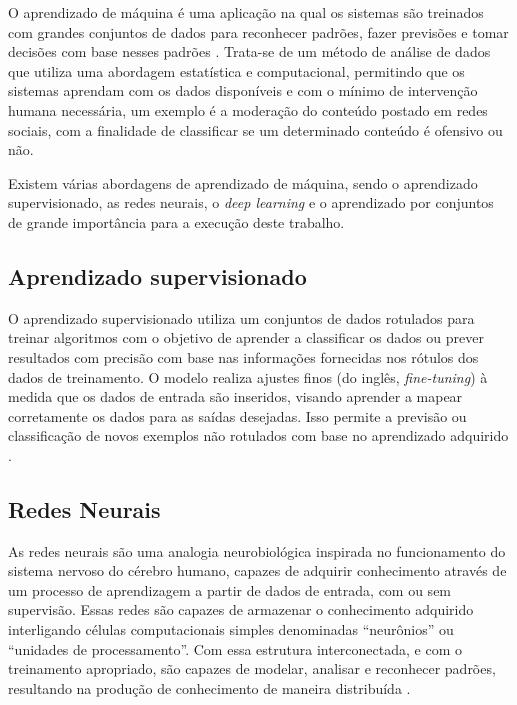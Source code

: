 O aprendizado de máquina é uma aplicação na qual os sistemas são treinados com grandes conjuntos de dados para reconhecer padrões, fazer previsões e tomar decisões com base nesses padrões \cite{HoschMachineLearning}. Trata-se de um método de análise de dados que utiliza uma abordagem estatística e computacional, permitindo que os sistemas aprendam com os dados disponíveis e com o mínimo de intervenção humana necessária, um exemplo é a moderação do conteúdo postado em redes sociais, com a finalidade de classificar se um determinado conteúdo é ofensivo ou não.

Existem várias abordagens de aprendizado de máquina, sendo o aprendizado supervisionado, as redes neurais, o \textit{deep learning} e o aprendizado por conjuntos de grande importância para a execução deste trabalho.

\subsection{Aprendizado supervisionado}

O aprendizado supervisionado utiliza um conjuntos de dados rotulados para treinar algoritmos com o objetivo de aprender a classificar os dados ou prever resultados com precisão com base nas informações fornecidas nos rótulos dos dados de treinamento. O modelo realiza ajustes finos (do inglês, \textit{fine-tuning}) à medida que os dados de entrada são inseridos, visando aprender a mapear corretamente os dados para as saídas desejadas. Isso permite a previsão ou classificação de novos exemplos não rotulados com base no aprendizado adquirido \cite{RussellNorvig1995}.

\subsection{Redes Neurais}

As redes neurais são uma analogia neurobiológica inspirada no funcionamento do sistema nervoso do cérebro humano, capazes de adquirir conhecimento através de um processo de aprendizagem a partir de dados de entrada, com ou sem supervisão. Essas redes são capazes de armazenar o conhecimento adquirido interligando células computacionais simples denominadas ``neurônios'' ou ``unidades de processamento''. Com essa estrutura interconectada, e com o treinamento apropriado, são capazes de modelar, analisar e reconhecer padrões, resultando na produção de conhecimento de maneira distribuída \cite{Haykin2007}.

